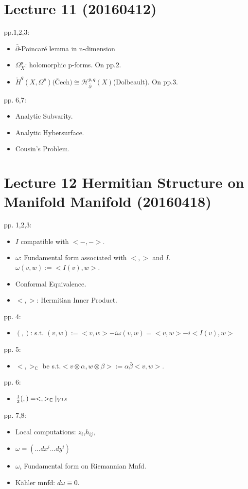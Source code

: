 \documentclass{book}
\numberwithin{equation}{subsection} %
\theoremstyle{definition}
\begin{document}
\section{Lecture 11 (20160412)}
pp.1,2,3: 
\begin{itemize}
    \item $\bar{\partial}$-Poincaré lemma in n-dimension
    \item $\Omega_X^p$: holomorphic p-forms. On pp.2.
    \item $\check{H}^q(X,\Omega^p)\text{(Čech)}\cong \mathcal{H}_{\bar{\partial}}^{p,q}(X)$(Dolbeault). On pp.3.
\end{itemize}
pp. 6,7:
\begin{itemize}
    \item Analytic Subvarity.
    \item Analytic Hybersurface.
    \item Cousin's Problem.
\end{itemize}
	
\section{Lecture 12 Hermitian Structure on Manifold  Manifold (20160418)}
pp. 1,2,3:
\begin{itemize}
    \item $I$ compatible with $<-,->$.
    \item $\omega$: Fundamental form associated with $<,>$ and $I$. $\omega(v,w):= <I(v),w>$.
    \item Conformal Equivalence.
    \item $<,>$: Hermitian Inner Product.
\end{itemize}
pp. 4:
\begin{itemize}
    \item $( , )$: s.t. $(v,w):=<v,w>-i\omega(v,w) = <v,w> - i <I(v),w>$
\end{itemize}
pp. 5:
\begin{itemize}
    \item $<,>_{\mathbb{C}}$ be s.t.$<v\otimes \alpha, w\otimes \beta>:= \alpha \bar{\beta} <v,w>$.
\end{itemize}
pp. 6:
\begin{itemize}
    \item $\frac{1}{2}(,) = <,>_{\mathbb{C}} \arrowvert_{V^{1,0}}$
\end{itemize}
pp. 7,8:
\begin{itemize}
    \item Local computations: $z_i$,$h_{ij}$,
    \item $\omega = (...dx^i...dy^i)$
    \item $\omega$, Fundamental form on Riemannian Mnfd.
    \item Kähler mnfd: $d\omega \equiv 0$.
\end{itemize}
	
\end{document}
